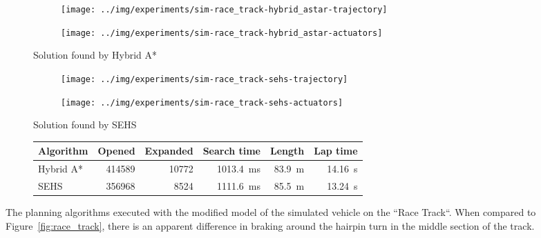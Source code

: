 \begin{figure}[!tbp]%
	\centering
	
	\begin{subfigure}[t]{\textwidth}
		\begin{subfigure}[c]{0.54\textwidth}
			\texttt{[image: ../img/experiments/sim-race\_track-hybrid\_astar-trajectory]}
		\end{subfigure}
		\hfill
		\begin{subfigure}[c]{0.45\textwidth}
			\texttt{[image: ../img/experiments/sim-race\_track-hybrid\_astar-actuators]}
		\end{subfigure}
		\caption{Solution found by Hybrid A*}
		\label{fig:sim-race_track-hybrid_astar}
	\end{subfigure}
	
	\vspace{0.75cm}
	
	\begin{subfigure}[t]{\textwidth}	
		\begin{subfigure}[c]{0.54\textwidth}
			\texttt{[image: ../img/experiments/sim-race\_track-sehs-trajectory]}
		\end{subfigure}
		\hfill
		\begin{subfigure}[c]{0.45\textwidth}
			\texttt{[image: ../img/experiments/sim-race\_track-sehs-actuators]}
		\end{subfigure}
		\caption{Solution found by SEHS}
		\label{fig:sim-race_track-sehs}
	\end{subfigure}
	
	\vspace{0.75cm}
	
	\begin{subfigure}[t]{\textwidth}
		\centering
		\begin{tabular}{l r r r r r}%
			\toprule
			Algorithm & Opened & Expanded & Search time & Length & Lap time \\
			\midrule
			Hybrid A* & \num{414589} & \num{10772} & \bftab \SI{1013.4}{\milli\second} & \SI{83.9}{\meter} & \SI{14.16}{\second} \\
			\gls*{SEHS} & \bftab \num{356968} & \bftab \num{8524} & \SI{1111.6}{\milli\second} & \SI{85.5}{\meter} & \bftab \SI{13.24}{\second} \\
			\bottomrule
		\end{tabular}
		\caption{}
		\label{table:sim-race_track}
	\end{subfigure}
	
	\vspace{0.75cm}
	
	\caption{The planning algorithms executed with the modified model of the simulated vehicle on the ``Race Track``. When compared to Figure~\ref{fig:race_track}, there is an apparent difference in braking around the hairpin turn in the middle section of the track.}
	\label{fig:sim-race_track}
\end{figure}

